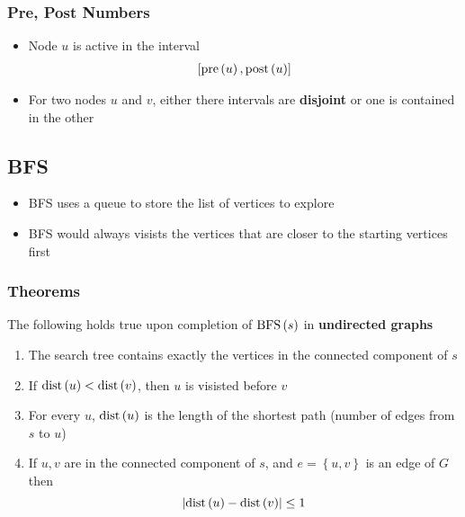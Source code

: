     \subsubsection{Pre, Post Numbers}

      \begin{itemize}
        \item Node $ u $ is active in the interval
        \begin{align*}
          \left[ \operatorname{pre}\left( u \right), \operatorname{post}\left( u \right) \right]
        \end{align*}

        \item For two nodes $ u $ and $ v $, either there intervals are
        \textbf{disjoint} or one is contained in the other
      \end{itemize}

  \subsection{BFS}

    \begin{itemize}
      \item BFS uses a queue to store the list of vertices to explore
      \item BFS would always visists the vertices that are closer to the
      starting vertices first
    \end{itemize}

    \subsubsection{Theorems}

      The following holds true upon completion of $ \operatorname{BFS}\left( s \right) $ in
      \textbf{undirected graphs}

      \begin{enumerate}
        \item The search tree contains exactly the vertices in the connected
        component of $ s $
        \item If $ \operatorname{dist}\left( u \right) < \operatorname{dist}\left( v \right) $, then $ u $
        is visisted before $ v $
        \item For every $ u $, $ \operatorname{dist}\left( u \right) $ is the length of the
        shortest path (number of edges from $ s $ to $ u $)
        \item If $ u, v $ are in the connected component of $ s $, and
        $ e = \left\{ u,v \right\} $ is an edge of $ G $ then
        \begin{equation}
          \left| \operatorname{dist}\left( u \right) - \operatorname{dist}\left( v \right) \right| \le 1
        \end{equation}
      \end{enumerate}

